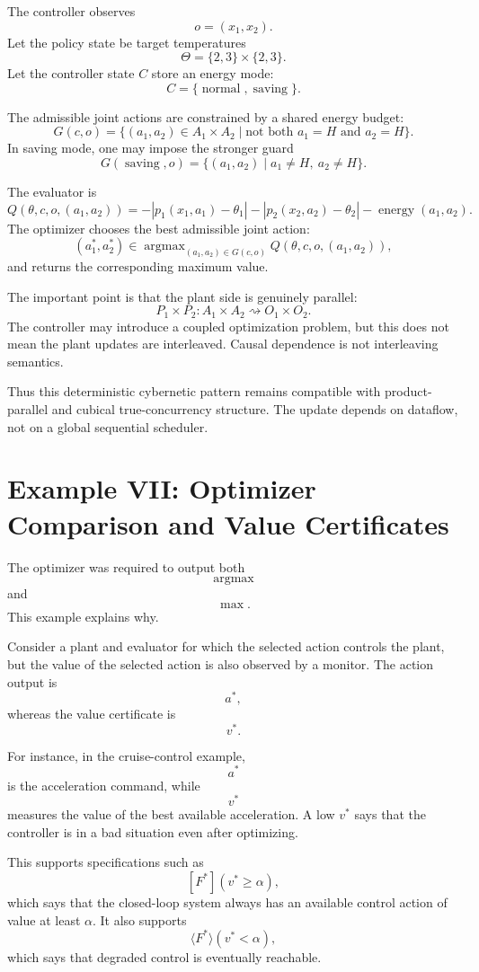 The controller observes
\[
o=(x_1,x_2).
\]
Let the policy state be target temperatures
\[
\Theta=\{2,3\}\times\{2,3\}.
\]
Let the controller state \(C\) store an energy mode:
\[
C=\{\operatorname{normal},\operatorname{saving}\}.
\]

The admissible joint actions are constrained by a shared energy budget:
\[
G(c,o)
=
\{(a_1,a_2)\in A_1\times A_2\mid \text{not both }a_1=H\text{ and }a_2=H\}.
\]
In saving mode, one may impose the stronger guard
\[
G(\operatorname{saving},o)
=
\{(a_1,a_2)\mid a_1\neq H,\ a_2\neq H\}.
\]

The evaluator is
\[
Q(\theta,c,o,(a_1,a_2))
=
-\left|p_1(x_1,a_1)-\theta_1\right|
-\left|p_2(x_2,a_2)-\theta_2\right|
-\operatorname{energy}(a_1,a_2).
\]
The optimizer chooses the best admissible joint action:
\[
(a_1^*,a_2^*)\in
\operatorname{argmax}_{(a_1,a_2)\in G(c,o)}
Q(\theta,c,o,(a_1,a_2)),
\]
and returns the corresponding maximum value.

The important point is that the plant side is genuinely parallel:
\[
P_1\times P_2:
A_1\times A_2
\rightsquigarrow
O_1\times O_2.
\]
The controller may introduce a coupled optimization problem, but this does not mean the plant
updates are interleaved.  Causal dependence is not interleaving semantics.

Thus this deterministic cybernetic pattern remains compatible with product-parallel and cubical
true-concurrency structure.  The update depends on dataflow, not on a global sequential scheduler.

\section{Example VII: Optimizer Comparison and Value Certificates}
\label{sec:example-optimizer-comparison}

The optimizer was required to output both
\[
\operatorname{argmax}
\]
and
\[
\max.
\]
This example explains why.

Consider a plant and evaluator for which the selected action controls the plant, but the value of
the selected action is also observed by a monitor.  The action output is
\[
a^*,
\]
whereas the value certificate is
\[
v^*.
\]

For instance, in the cruise-control example,
\[
a^*
\]
is the acceleration command, while
\[
v^*
\]
measures the value of the best available acceleration.  A low \(v^*\) says that the controller is
in a bad situation even after optimizing.

This supports specifications such as
\[
[F^*](v^*\geq \alpha),
\]
which says that the closed-loop system always has an available control action of value at least
\(\alpha\).  It also supports
\[
\langle F^*\rangle(v^*<\alpha),
\]
which says that degraded control is eventually reachable.

